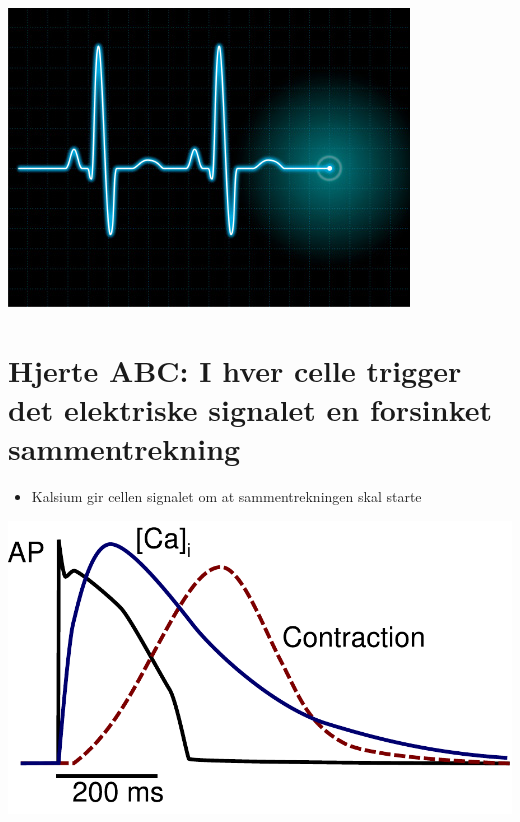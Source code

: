 \documentclass[%
oneside,                 %
final,                   %
10pt]{article}
\begin{document}
\centerline{\includegraphics[width=0.9\linewidth]{fig/ecg.jpg}}




\section{Hjerte ABC: I hver celle trigger det elektriske signalet en forsinket sammentrekning}

\begin{itemize}
\item Kalsium gir cellen signalet om at sammentrekningen skal starte
\end{itemize}

\noindent



\centerline{\includegraphics[width=0.9\linewidth]{fig/AP_Ca_contraction.pdf}}
\end{document}
